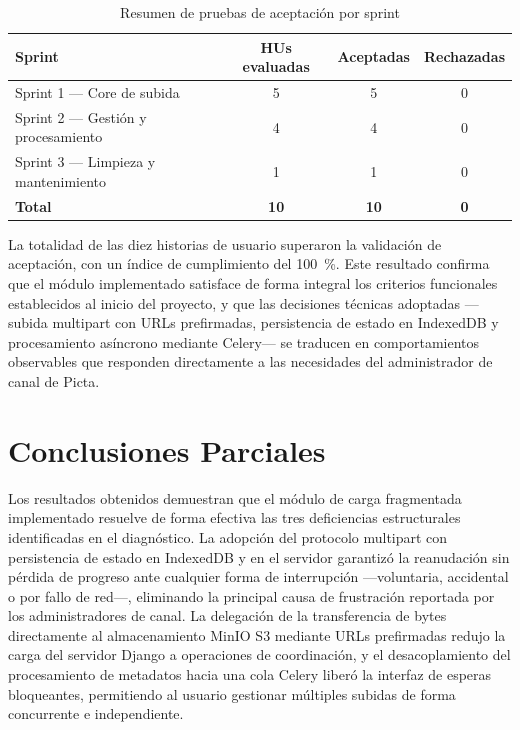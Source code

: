\begin{table}[htbp]
\centering
\caption{Resumen de pruebas de aceptación por sprint}
\label{tab:aceptacion_resumen}
\begin{tabular}{|l|c|c|c|}
\hline
\textbf{Sprint} & \textbf{HUs evaluadas} & \textbf{Aceptadas} & \textbf{Rechazadas} \\
\hline
Sprint 1 — Core de subida              & 5 & 5 & 0 \\
\hline
Sprint 2 — Gestión y procesamiento     & 4 & 4 & 0 \\
\hline
Sprint 3 — Limpieza y mantenimiento    & 1 & 1 & 0 \\
\hline
\textbf{Total}                         & \textbf{10} & \textbf{10} & \textbf{0} \\
\hline
\end{tabular}
\end{table}

La totalidad de las diez historias de usuario superaron la validación de aceptación, con un índice
de cumplimiento del 100~\%. Este resultado confirma que el módulo implementado satisface de forma
integral los criterios funcionales establecidos al inicio del proyecto, y que las decisiones técnicas
adoptadas ---subida multipart con URLs prefirmadas, persistencia de estado en IndexedDB y
procesamiento asíncrono mediante Celery--- se traducen en comportamientos observables que responden
directamente a las necesidades del administrador de canal de Picta.

\section{Conclusiones Parciales}
 
Los resultados obtenidos demuestran que el módulo de carga fragmentada implementado resuelve de
forma efectiva las tres deficiencias estructurales identificadas en el diagnóstico. La adopción del
protocolo multipart con persistencia de estado en IndexedDB y en el servidor garantizó la
reanudación sin pérdida de progreso ante cualquier forma de interrupción ---voluntaria, accidental o
por fallo de red---, eliminando la principal causa de frustración reportada por los administradores
de canal. La delegación de la transferencia de bytes directamente al almacenamiento MinIO S3
mediante URLs prefirmadas redujo la carga del servidor Django a operaciones de coordinación, y el
desacoplamiento del procesamiento de metadatos hacia una cola Celery liberó la interfaz de esperas
bloqueantes, permitiendo al usuario gestionar múltiples subidas de forma concurrente e independiente.
 
